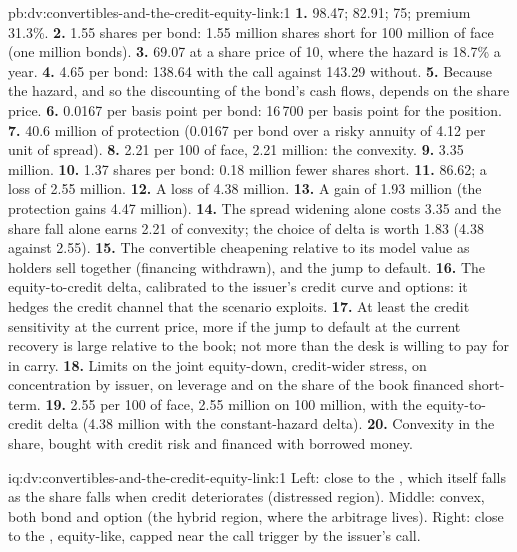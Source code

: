 \begin{solution}{pb:dv:convertibles-and-the-credit-equity-link:1}
\textbf{1.} 98.47;  82.91;  75; premium 31.3\%.
\textbf{2.} 1.55 shares per bond: 1.55 million shares short for 100 million of face (one million bonds).
\textbf{3.} 69.07 at a share price of 10, where the hazard is 18.7\% a year.
\textbf{4.} 4.65 per bond: 138.64 with the call against 143.29 without.
\textbf{5.} Because the hazard, and so the discounting of the bond's cash flows, depends on the share price.
\textbf{6.} 0.0167 per basis point per bond: 16\,700 per basis point for the position.
\textbf{7.} 40.6 million of protection (0.0167 per bond over a risky annuity of 4.12 per unit of spread).
\textbf{8.} 2.21 per 100 of face, 2.21 million: the convexity.
\textbf{9.} 3.35 million.
\textbf{10.} 1.37 shares per bond: 0.18 million fewer shares short.
\textbf{11.} 86.62; a loss of 2.55 million.
\textbf{12.} A loss of 4.38 million.
\textbf{13.} A gain of 1.93 million (the protection gains 4.47 million).
\textbf{14.} The spread widening alone costs 3.35 and the share fall alone earns 2.21 of convexity; the choice of delta is worth 1.83 (4.38 against 2.55).
\textbf{15.} The convertible cheapening relative to its model value as holders sell together (financing withdrawn), and the jump to default.
\textbf{16.} The equity-to-credit delta, calibrated to the issuer's credit curve and options: it hedges the credit channel that the scenario exploits.
\textbf{17.} At least the credit sensitivity at the current price, more if the jump to default at the current recovery is large relative to the book;
not more than the desk is willing to pay for in carry.
\textbf{18.} Limits on the joint equity-down, credit-wider stress, on concentration by issuer, on leverage and on the share of the book financed short-term.
\textbf{19.} 2.55 per 100 of face, 2.55 million on 100 million, with the equity-to-credit delta (4.38 million with the constant-hazard delta).
\textbf{20.} Convexity in the share, bought with credit risk and financed with borrowed money.
\end{solution}

\begin{solution}{iq:dv:convertibles-and-the-credit-equity-link:1}
Left: close to the , which itself falls as the share falls when credit deteriorates (distressed region). Middle: convex, both bond and
option (the hybrid region, where the arbitrage lives). Right: close to the , equity-like, capped near the call trigger by the
issuer's call.
\end{solution}

